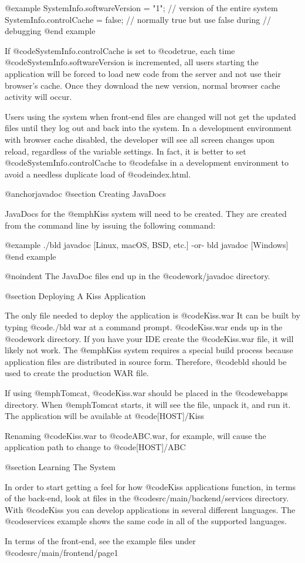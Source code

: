 @example
SystemInfo.softwareVersion = "1";  // version of the entire system
SystemInfo.controlCache = false;   // normally true but use false during
                            // debugging
@end example

If @code{SystemInfo.controlCache} is set to @code{true}, each time @code{SystemInfo.softwareVersion}
is incremented, all users starting the application will be forced to
load new code from the server and not use their browser's cache.  Once
they download the new version, normal browser cache activity will
occur.

Users using the system when front-end files are changed will not get
the updated files until they log out and back into the system.  In a
development environment with browser cache disabled, the developer
will see all screen changes upon reload, regardless of the variable settings.
In fact, it is better to set @code{SystemInfo.controlCache} to @code{false}
in a development environment to avoid a needless duplicate load of @code{index.html}.


@anchor{javadoc} @section Creating JavaDocs

JavaDocs for the @emph{Kiss} system will need to be created.  They are
created from the command line by issuing the following command:

@example
./bld javadoc              [Linux, macOS, BSD, etc.]
    -or-
bld javadoc                [Windows]
@end example

@noindent
The JavaDoc files end up in the @code{work/javadoc} directory.


@section Deploying A Kiss Application

The only file needed to deploy the application is @code{Kiss.war} It
can be built by typing @code{./bld war} at a command prompt.
@code{Kiss.war} ends up in the @code{work} directory.  If you
have your IDE create the @code{Kiss.war} file, it will likely not
work.  The @emph{Kiss} system requires a special build process because
application files are distributed in source form.  Therefore, @code{bld}
should be used to create the production WAR file.

If using @emph{Tomcat}, @code{Kiss.war} should be placed in the
@code{webapps} directory.  When @emph{Tomcat} starts, it will see the
file, unpack it, and run it.  The application will be available at
@code{[HOST]/Kiss}

Renaming @code{Kiss.war} to @code{ABC.war}, for example, will cause
the application path to change to @code{[HOST]/ABC}

@section Learning The System

In order to start getting a feel for how @code{Kiss} applications
function, in terms of the back-end, look at files in the
@code{src/main/backend/services} directory.  With @code{Kiss} you can
develop applications in several different languages.  The @code{services}
example shows the same code in all of the supported languages.

In terms of the front-end, see the example files under @code{src/main/frontend/page1}
